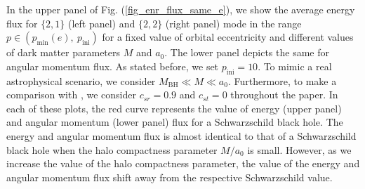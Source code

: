\documentclass[11pt]{article}
\begin{document}
In the upper panel of Fig. (\ref{fig_enr_flux_same_e}), we show the average energy flux for $\{2,1\}$ (left panel) and $\{2,2\}$ (right panel) mode in the range $p\in(p_{\textrm{min}}(e),~p_{\textrm{ini}})$ for a fixed value of orbital eccentricity and different values of dark matter parameters $M$ and $a_0$. The lower panel depicts the same for angular momentum flux. As stated before, we set $p_{\textrm{ini}}=10$. To mimic a real astrophysical scenario, we consider $M_{\textrm{BH}}\ll M\ll a_0$. Furthermore, to make a comparison with \cite{Cardoso:2022whc}, we consider $c_{sr}=0.9$ and $c_{st}=0$ throughout the paper. In each of these plots, the red curve represents the value of energy (upper panel) and angular momentum  (lower panel) flux for a Schwarzschild black hole. The energy and angular momentum flux is almost identical to that of a Schwarzschild black hole when the halo compactness parameter $M/a_0$ is small. However, as we increase the value of the halo compactness parameter, the value of the energy and angular momentum flux shift away from the respective Schwarzschild value. 
\end{document}
